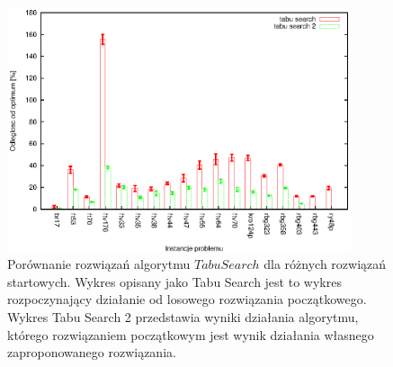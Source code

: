 \begin{figure}
\begin{center}
\includegraphics[width=0.9\textwidth]{wykresy/tabu_quality_2}
\end{center}
\caption{Porównanie rozwiązań algorytmu $Tabu Search$ dla różnych rozwiązań
startowych. Wykres opisany jako Tabu Search jest to wykres rozpoczynający
działanie od losowego rozwiązania początkowego. Wykres Tabu Search 2 przedstawia
wyniki działania algorytmu, którego rozwiązaniem początkowym jest wynik 
działania własnego zaproponowanego rozwiązania.}
\label{tabu_quality_2}
\end{figure}